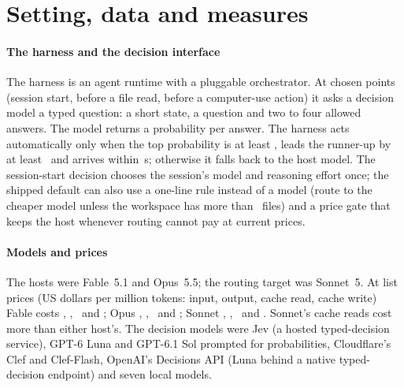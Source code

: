 \section{Setting, data and measures}\label{sec:setting}

\paragraph{The harness and the decision interface} The harness is an agent runtime with a pluggable orchestrator.
At chosen points (session start, before a file read, before a computer-use action) it asks a decision model a typed
question: a short state, a question and two to four allowed answers. The model returns a probability per answer. The
harness acts automatically only when the top probability is at least \MinP, leads the runner-up by at least
\MinMargin\ and arrives within \TimeoutS\,s; otherwise it falls back to the host model. The session-start decision
chooses the session's model and reasoning effort once; the shipped default can also use a one-line rule instead of a
model (route to the cheaper model unless the workspace has more than \AoScopeFiles\ files) and a price gate that keeps
the host whenever routing cannot pay at current prices.

\paragraph{Models and prices} The hosts were Fable~5.1 and Opus~5.5; the routing target was Sonnet~5. At list prices
(US dollars per million tokens: input, output, cache read, cache write) Fable costs \PriceFableIn, \PriceFableOut,
\PriceFableRead\ and \PriceFableWrite; Opus \PriceOpusIn, \PriceOpusOut, \PriceOpusRead\ and \PriceOpusWrite; Sonnet
\PriceSonnetIn, \PriceSonnetOut, \PriceSonnetRead\ and \PriceSonnetWrite. Sonnet's cache reads cost more than either
host's. The decision models were Jev (a hosted typed-decision service), GPT-6 Luna and GPT-6.1 Sol prompted for
probabilities, Cloudflare's Clef and Clef-Flash, OpenAI's Decisions API (Luna behind a native typed-decision endpoint)
and seven local models.

